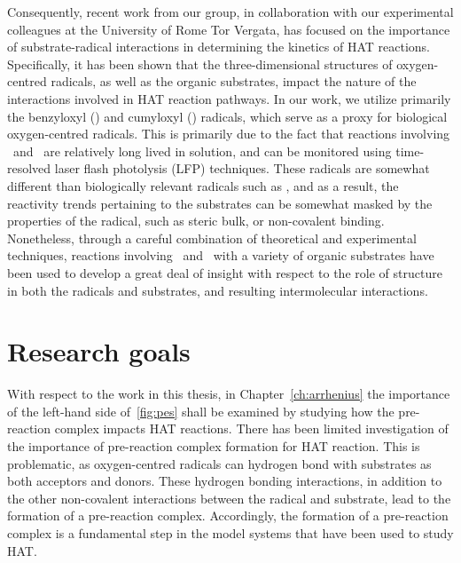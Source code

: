 Consequently, recent work from our group, in collaboration with our experimental colleagues at the University of Rome Tor Vergata, has focused on the importance of substrate-radical interactions in determining the kinetics of HAT reactions. Specifically, it has been shown that the three-dimensional structures of oxygen-centred radicals, as well as the organic substrates, impact the nature of the interactions involved in HAT reaction pathways.\cite{Salamone2015Rev} In our work, we utilize primarily the benzyloxyl (\bno) and cumyloxyl (\cumo) radicals, which serve as a proxy for biological oxygen-centred radicals. This is primarily due to the fact that reactions involving \bno\ and \cumo\ are relatively long lived in solution, and can be monitored using time-resolved laser flash photolysis (LFP) techniques. These radicals are somewhat different than biologically relevant radicals such as , and as a result, the reactivity trends pertaining to the substrates can be somewhat masked by the properties of the radical, such as steric bulk,\cite{Finn2004} or non-covalent binding.\cite{Salamone2011b} Nonetheless, through a careful combination of theoretical and experimental techniques, reactions involving \bno\ and \cumo\ with a variety of organic substrates have been used to develop a great deal of insight with respect to the role of structure in both the radicals and substrates, and resulting intermolecular interactions.

\section{Research goals}

With respect to the work in this thesis, in Chapter~\ref{ch:arrhenius} the importance of the left-hand side of~\ref{fig:pes} shall be examined by studying how the pre-reaction complex impacts HAT reactions. There has been limited investigation of the importance of pre-reaction complex formation for HAT reaction.\cite{Kreilick1966} This is problematic, as oxygen-centred radicals can hydrogen bond with substrates as both acceptors and donors.\cite{Johnson2009a} These hydrogen bonding interactions, in addition to the other non-covalent interactions between the radical and substrate, lead to the formation of a pre-reaction complex. Accordingly, the formation of a pre-reaction complex is a fundamental step in the model systems that have been used to study HAT.

